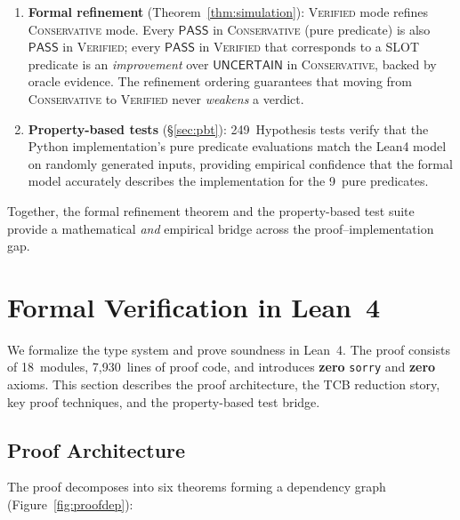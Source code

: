 \documentclass[sigplan,10pt,manuscript,review,anonymous]{acmart}
\newcommand{\PASS}{\ensuremath{\mathsf{PASS}}\xspace}
\newcommand{\UNCERTAIN}{\ensuremath{\mathsf{UNCERTAIN}}\xspace}
\newcommand{\CONSERVATIVE}{\textsc{Conservative}\xspace}
\newcommand{\VERIFIED}{\textsc{Verified}\xspace}
\begin{document}
\begin{enumerate}[leftmargin=*,itemsep=1pt,topsep=2pt]
\item \textbf{Formal refinement} (Theorem~\ref{thm:simulation}):
  \VERIFIED{} mode refines \CONSERVATIVE{} mode.
  Every \PASS{} in \CONSERVATIVE{} (pure predicate) is also \PASS{}
  in \VERIFIED{}; every \PASS{} in \VERIFIED{} that corresponds to a
  SLOT predicate is an \emph{improvement} over \UNCERTAIN{} in
  \CONSERVATIVE{}, backed by oracle evidence.
  The refinement ordering guarantees that moving from
  \CONSERVATIVE{} to \VERIFIED{} never \emph{weakens} a verdict.

\item \textbf{Property-based tests} (\S\ref{sec:pbt}):
  249~Hypothesis tests verify that the Python implementation's pure
  predicate evaluations match the Lean4 model on randomly generated
  inputs, providing empirical confidence that the formal model
  accurately describes the implementation for the 9~pure predicates.
\end{enumerate}

Together, the formal refinement theorem and the property-based test
suite provide a mathematical \emph{and} empirical bridge across the
proof--implementation gap.

\section{Formal Verification in Lean~4}\label{sec:proof}

We formalize the type system and prove soundness in Lean~4.
The proof consists of 18~modules, 7{,}930~lines of proof code, and
introduces \textbf{zero} \texttt{sorry} and \textbf{zero} axioms.
This section describes the proof architecture, the TCB reduction story,
key proof techniques, and the property-based test bridge.

\subsection{Proof Architecture}\label{sec:proof-arch}

The proof decomposes into six theorems forming a dependency
graph (Figure~\ref{fig:proofdep}):
\end{document}
